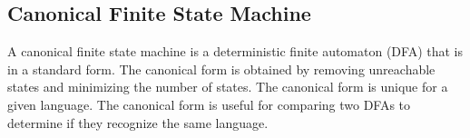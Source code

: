 \subsection{Canonical Finite State Machine}
A canonical finite state machine is a deterministic finite automaton (DFA) that is in a standard form. The canonical form is obtained by removing unreachable states and minimizing the number of states. The canonical form is unique for a given language. The canonical form is useful for comparing two DFAs to determine if they recognize the same language.
